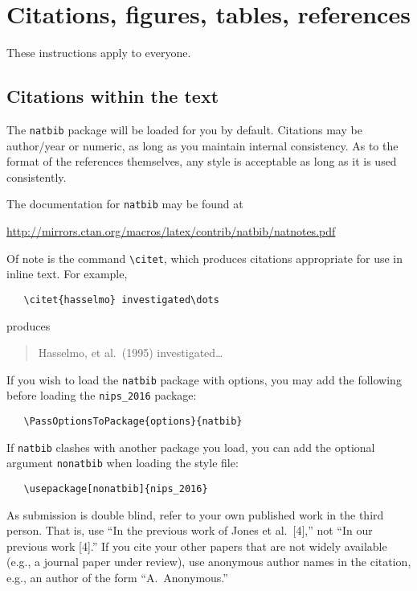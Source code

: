 \documentclass{article}
\begin{document}
\section{Citations, figures, tables, references}
\label{others}

These instructions apply to everyone.

\subsection{Citations within the text}

The \verb+natbib+ package will be loaded for you by default.
Citations may be author/year or numeric, as long as you maintain
internal consistency.  As to the format of the references themselves,
any style is acceptable as long as it is used consistently.

The documentation for \verb+natbib+ may be found at
\begin{center}
  \url{http://mirrors.ctan.org/macros/latex/contrib/natbib/natnotes.pdf}
\end{center}
Of note is the command \verb+\citet+, which produces citations
appropriate for use in inline text.  For example,
\begin{verbatim}
   \citet{hasselmo} investigated\dots
\end{verbatim}
produces
\begin{quote}
  Hasselmo, et al.\ (1995) investigated\dots
\end{quote}

If you wish to load the \verb+natbib+ package with options, you may
add the following before loading the \verb+nips_2016+ package:
\begin{verbatim}
   \PassOptionsToPackage{options}{natbib}
\end{verbatim}

If \verb+natbib+ clashes with another package you load, you can add
the optional argument \verb+nonatbib+ when loading the style file:
\begin{verbatim}
   \usepackage[nonatbib]{nips_2016}
\end{verbatim}

As submission is double blind, refer to your own published work in the
third person. That is, use ``In the previous work of Jones et
al.\ [4],'' not ``In our previous work [4].'' If you cite your other
papers that are not widely available (e.g., a journal paper under
review), use anonymous author names in the citation, e.g., an author
of the form ``A.\ Anonymous.''
\end{document}
